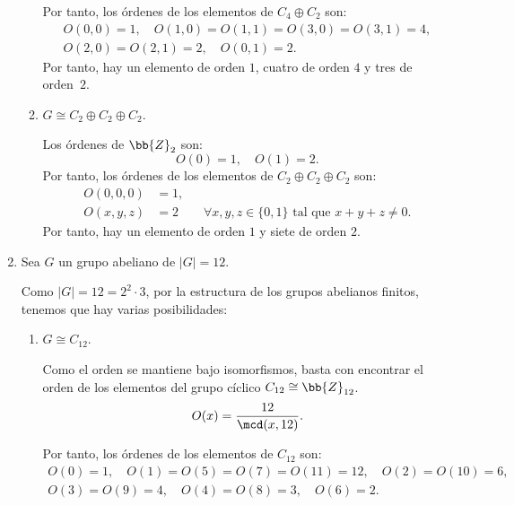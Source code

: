 \begin{ejercicio}
\begin{enumerate}
\begin{enumerate}
            Por tanto, los órdenes de los elementos de $C_4 \oplus C_2$ son:
            \begin{gather*}
                O(0, 0) = 1, \quad
                O(1, 0) = O(1,1) = O(3, 0) = O(3, 1) = 4, \\
                O(2, 0) = O(2, 1) = 2, \quad
                O(0, 1) = 2.
            \end{gather*}
            Por tanto, hay un elemento de orden $1$, cuatro de orden $4$ y tres de orden~$2$.
            \item $G \cong C_2 \oplus C_2 \oplus C_2$.
            
            Los órdenes de $\bb{Z}_2$ son:
            \begin{equation*}
                O(0) = 1, \quad O(1) = 2.
            \end{equation*}
            Por tanto, los órdenes de los elementos de $C_2 \oplus C_2 \oplus C_2$ son:
            \begin{align*}
                O(0, 0, 0) &= 1, \\
                O(x,y,z) &= 2 \qquad \forall x,y,z \in \{0,1\} \text{ tal que } x+y+z \neq 0.
            \end{align*}
            Por tanto, hay un elemento de orden $1$ y siete de orden $2$.
        \end{enumerate}



        \item Sea $G$ un grupo abeliano de $|G| = 12$.
        
        Como $|G|=12=2^2 \cdot 3$, por la estructura de los grupos abelianos finitos, tenemos que hay varias posibilidades:
        \begin{enumerate}
            \item $G \cong C_{12}$.
            
            Como el orden se mantiene bajo isomorfismos, basta con encontrar el orden de los elementos del grupo cíclico $C_{12}\cong \bb{Z}_{12}$.
            \begin{equation*}
                O(x) = \frac{12}{\mcd(x, 12)}.
            \end{equation*}

            Por tanto, los órdenes de los elementos de $C_{12}$ son:
            \begin{gather*}
                O(0) = 1, \quad
                O(1) = O(5) = O(7) = O(11) = 12, \quad
                O(2) = O(10) = 6,\\
                O(3) = O(9) = 4, \quad
                O(4) = O(8) = 3, \quad
                O(6) = 2.
            \end{gather*}


\end{enumerate}
\end{enumerate}
\end{ejercicio}
